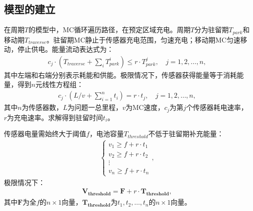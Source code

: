 \documentclass{whutmod}
\begin{document}
        \subsection{模型的建立}
            在周期$T$的模型中，MC循环遍历路径，在预定区域充电。周期$T$分为驻留期$T_{park}$和移动期$T_{traverse}$。驻留期MC静止于传感器充电范围，匀速充电；移动期MC匀速移动，停止供电。能量流动表达式为：
            \begin{gather}\label{ssssssss}
                c_j \cdot (T_{traverse} + \sum_{i} T_{park}^i) \leq r \cdot T_{park}^j, \quad j=1,2,\dots,n,
            \end{gather}
            其中左端和右端分别表示耗能和供能。极限情况下，传感器获得能量等于消耗能量，得到$n$元线性方程组：
            \begin{gather}
                c_j \cdot (L/v + \sum_{i=1}^{n} t_i) = r \cdot t_j, \quad j=1,2,\dots,n,
            \end{gather}
            其中$n$为传感器数，$L$为问题一总里程，$v$为MC速度，$c_j$为第$j$个传感器耗电速率，$r$为充电速率。求解得到驻留时间$t_i$。

            传感器电量需始终大于阈值$f$，电池容量$T_{threshold}$不低于驻留期补充能量：
            \begin{gather}
                \left\{
                \begin{matrix}
                    v_1 \geq f + r \cdot t_1 \\
                    v_2 \geq f + r \cdot t_2 \\
                    \vdots \\
                    v_n \geq f + r \cdot t_n
                \end{matrix}
                \right.,
            \end{gather}
            极限情况下：
            \begin{gather}
                \bm{V_{threshold}} = \bm{F} + r \cdot \bm{T_{threshold}},
            \end{gather}
            其中$\bm{F}$为全$f$的$n \times 1$向量，$\bm{T_{threshold}}$为$t_1, t_2, \dots, t_n$的$n \times 1$向量。
\end{document}
